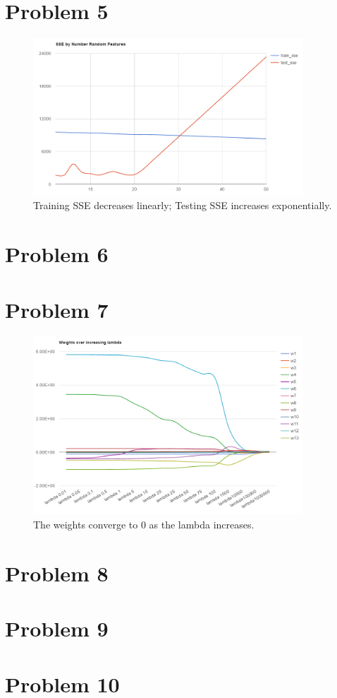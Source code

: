 \documentclass[journal]{IEEEtran}
\begin{document}
\section{Problem 5}
\begin{figure}[!h]
\centering
\captionsetup{justification=centering,margin=2cm}
\includegraphics[width=0.9\textwidth]{sse_rand_features.PNG}
\caption{\label{fig:sse}Training SSE decreases linearly; Testing SSE increases exponentially.}
\end{figure}

\medskip

\section{Problem 6}
\medskip

\section{Problem 7}
\begin{figure}[!h]
\centering
\captionsetup{justification=centering,margin=2cm}
\includegraphics[width=0.9\textwidth]{weights_lambda.PNG}
\caption{\label{fig:lambdas}The weights converge to 0 as the lambda increases.}
\end{figure}
\medskip

\section{Problem 8}
\medskip

\section{Problem 9}
\medskip

\section{Problem 10}
\medskip

 
\end{document}
